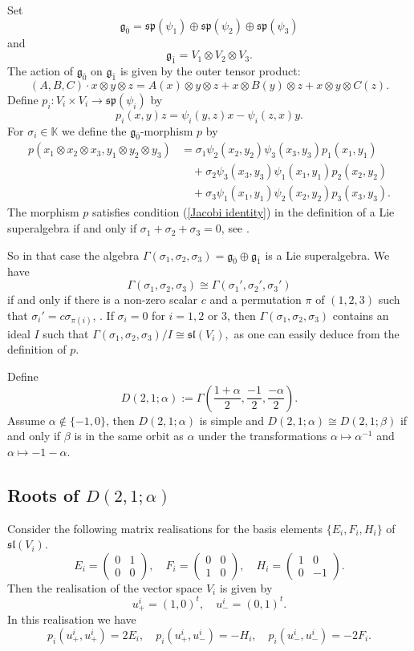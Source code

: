 \documentclass{amsart}
\numberwithin{theorem}{section}
\theoremstyle{definition}
\theoremstyle{remark}
\newcommand{\ds}[1]{\mathds{#1}}
\newcommand{\g}{{\mathfrak{g}}}
\newcommand{\oa}{\bar{0}}
\newcommand{\ob}{\bar{1}}
\begin{document}
Set 
\[
\g_{\oa} = \mathfrak{sp}(\psi_1) \oplus \mathfrak{sp}(\psi_2)\oplus \mathfrak{sp}(\psi_3)
\]
and
\[
\g_{\ob}= V_1 \otimes V_2 \otimes V_3.
\]
The action of $\g_{\oa}$ on $\g_{\ob}$ is given by the outer tensor product:
\[
(A,B,C)\cdot  x\otimes y \otimes z = A (x)\otimes y \otimes z+ x\otimes B(y) \otimes z+x\otimes y \otimes C(z).
\]
Define $p_i\colon V_i \times V_i \to \mathfrak{sp}(\psi_i)$ by
\[ p_i(x,y)z= \psi_i(y,z) x- \psi_i(z,x)y.\] 
  For $\sigma_i \in \ds K$ we define the $\g_{\oa}$-morphism $p$ by 
 \begin{align*}
  p(x_1\otimes x_2\otimes x_3,y_1\otimes y_2\otimes y_3)&= \sigma_1 \psi_2(x_2,y_2)\psi_3(x_3,y_3) p_1(x_1,y_1) \\
  &\quad +\sigma_2 \psi_3(x_3,y_3)\psi_1(x_1,y_1) p_2(x_2,y_2)\\
  &\quad +\sigma_3 \psi_1(x_1,y_1)\psi_2(x_2,y_2) p_3(x_3,y_3).
  \end{align*}
The morphism $p$ satisfies condition (\ref{Jacobi identity}) in the definition of a Lie superalgebra if and only if $\sigma_1+\sigma_2+\sigma_3=0$, see \cite[Lemma 4.2.1]{Mu}.

So in that case the algebra $\Gamma(\sigma_1,\sigma_2,\sigma_3)= \g_{\oa}\oplus\g_{\ob}$ is a Lie superalgebra. 
We have \[ \Gamma(\sigma_1,\sigma_2,\sigma_3)\cong \Gamma(\sigma_1',\sigma_2',\sigma_3')
\]
if and only if there is a non-zero scalar $c$ and a permutation $\pi$ of $(1,2,3)$ such that $\sigma_i'= c \sigma_{\pi(i)}$, \cite[Lemma 5.5.16]{Mu}. If $\sigma_i=0$ for $i=1,2$ or $3$, then $\Gamma(\sigma_1,\sigma_2,\sigma_3)$ contains an ideal $I$ such that $\Gamma(\sigma_1,\sigma_2,\sigma_3) / I \cong \mathfrak{sl}(V_i),$ as one can easily deduce from the definition of $p$.

Define \[D(2,1;\alpha) := \Gamma\left(\frac{1+\alpha}{2},\frac{-1}{2},\frac{-\alpha}{2}\right). \]
Assume $\alpha \not\in \{-1,0\}$, then $D(2,1;\alpha)$ is simple and $D(2,1;\alpha)\cong D(2,1;\beta)$ if and only if $\beta$ is in the same orbit as $\alpha$ under the transformations $\alpha \mapsto \alpha^{-1}$ and $\alpha \mapsto -1-\alpha$. 

\subsection{Roots of $D(2,1;\alpha)$} 
Consider the following matrix realisations for the basis elements $\{E_i,F_i,H_i\}$ of $\mathfrak{sl}(V_i)$.
\[
E_i= \left(\begin{array}{rr}
0 & 1 \\
0 & 0
\end{array}\right), \quad F_i =  \left(\begin{array}{rr}
0 & 0 \\
1 & 0
\end{array}\right),\quad  H_i=\left(\begin{array}{rr}
1 & 0 \\
0 & -1
\end{array}\right).
\] 
Then the realisation of the vector space $V_i$ is given by
\[
u_+^i = (1,0)^t , \quad u_-^i = (0,1)^t.
\]
In this realisation we have 
\[
p_i(u_+^i,u_+^i)= 2 E_i, \quad p_i(u_+^i,u_-^i)=-H_i, \quad p_i(u_-^i,u_-^i)= -2 F_i.
\]
\end{document}
